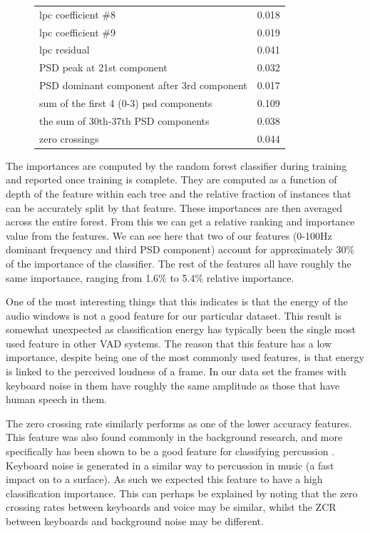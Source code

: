 \documentclass[ %
                    author={Sam Phippen},
                supervisor={Dr. Rafal Bogacz},
                     title={Real time voice activity detectors in noisy personal computing environments},
                  subtitle={},
                    degree={MEng},
                      year={2012} ]{thesis}
\begin{document}
\begin{figure}
\begin{tabular}{| l | l |}
        lpc coefficient \#8                        & 0.018 \\
        lpc coefficient \#9                        & 0.019 \\
        lpc residual                               & 0.041 \\
        PSD peak at 21st component                 & 0.032 \\
        PSD dominant component after 3rd component & 0.017 \\
        sum of the first 4 (0-3) psd components    & 0.109 \\
        the sum of 30th-37th PSD components        & 0.038 \\
        zero crossings                             & 0.044  \\
    \hline
    \end{tabular}
\end{figure}

The importances are computed by the random forest classifier during training
and reported once training is complete. They are computed as a function of
depth of the feature within each tree and the relative fraction of instances
that can be accurately split by that feature. These importances are then
averaged across the entire forest. From this we can get a relative ranking and
importance value from the features. We can see here that two of our features
(0-100Hz dominant frequency and third PSD component) account for approximately
30\% of the importance of the classifier. The rest of the features all have
roughly the same importance, ranging from 1.6\% to 5.4\% relative importance.

One of the most interesting things that this indicates is that the energy of
the audio windows is not a good feature for our particular dataset. This result
is somewhat unexpected as classification energy has typically been the single
most used feature in other VAD systems. The reason that this feature has a low
importance, despite being one of the most commonly used features, is that
energy is linked to the perceived loudness of a frame. In our data set the
frames with keyboard noise in them have roughly the same amplitude as those
that have human speech in them.

The zero crossing rate similarly performs as one of the lower accuracy
features. This feature was also found commonly in the background research, and
more specifically has been shown to be a good feature for classifying
percussion \cite{gouyon}. Keyboard noise is generated in a similar way to
percussion in music (a fast impact on to a surface). As such we expected this
feature to have a high classification importance. This can perhaps be explained
by noting that the zero crossing rates between keyboards and voice may be
similar, whilst the ZCR between keyboards and background noise may be
different.
\end{document}
